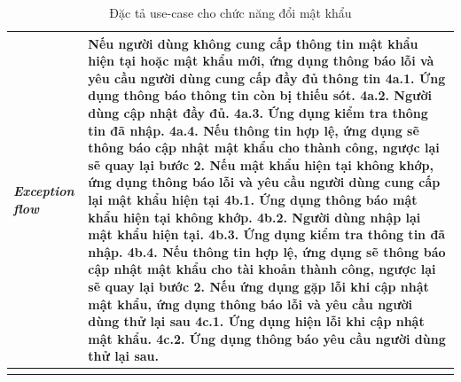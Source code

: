 \begin{center}
\begin{longtable}{
        |>{\raggedright\arraybackslash}p{3cm}
        |>{\raggedright\arraybackslash}p{13cm}
        |}
        \\\hdashline
        \rowcolor{cyan!10!white} \textit{Exception flow} &
        \textbf{Nếu người dùng không cung cấp thông tin mật khẩu hiện tại hoặc mật khẩu mới, ứng dụng thông báo lỗi và yêu cầu người dùng cung cấp đầy đủ thông tin} \newline
        4a.1. Ứng dụng thông báo thông tin còn bị thiếu sót. \newline
        4a.2. Người dùng cập nhật đầy đủ. \newline
        4a.3. Ứng dụng kiểm tra thông tin đã nhập. \newline
        4a.4. Nếu thông tin hợp lệ, ứng dụng sẽ thông báo cập nhật mật khẩu cho thành công, ngược lại sẽ quay lại bước 2. \newline
        \textbf{Nếu mật khẩu hiện tại không khớp, ứng dụng thông báo lỗi và yêu cầu người dùng cung cấp lại mật khẩu hiện tại} \newline
        4b.1. Ứng dụng thông báo mật khẩu hiện tại không khớp. \newline
        4b.2. Người dùng nhập lại mật khẩu hiện tại. \newline
        4b.3. Ứng dụng kiểm tra thông tin đã nhập. \newline
        4b.4. Nếu thông tin hợp lệ, ứng dụng sẽ thông báo cập nhật mật khẩu cho tài khoản thành công, ngược lại sẽ quay lại bước 2. \newline
        \textbf{Nếu ứng dụng gặp lỗi khi cập nhật mật khẩu, ứng dụng thông báo lỗi và yêu cầu người dùng thử lại sau} \newline
        4c.1. Ứng dụng hiện lỗi khi cập nhật mật khẩu. \newline
        4c.2. Ứng dụng thông báo yêu cầu người dùng thử lại sau.
        \\\hline
        \caption{Đặc tả use-case cho chức năng đổi mật khẩu}
    \end{longtable}
\end{center}
